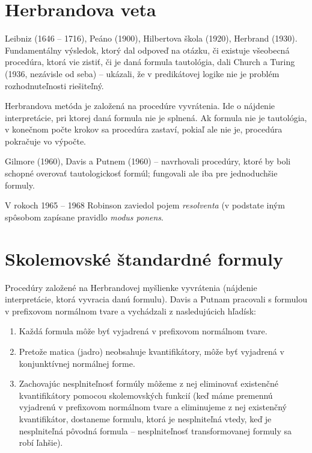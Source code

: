 \section{Herbrandova veta}
\startFIXME
\par Leibniz (1646 -- 1716), Peáno (1900), Hilbertova škola (1920), Herbrand
(1930). Fundamentálny výsledok, ktorý dal odpoveď na otázku, či existuje
všeobecná procedúra, ktorá vie zistiť, či je daná formula tautológia, dali
Church a Turing (1936, nezávisle od seba) -- ukázali, že v predikátovej logike
nie je problém rozhodnuteľnosti riešiteľný.
\par Herbrandova metóda je založená na procedúre vyvrátenia. Ide o nájdenie
interpretácie, pri ktorej daná formula nie je splnená. Ak formula nie je
tautológia, v konečnom počte krokov sa procedúra zastaví, pokiaľ ale nie je,
procedúra pokračuje vo výpočte.

\par Gilmore (1960), Davis a Putnem (1960) -- navrhovali procedúry, ktoré by
boli schopné overovať tautologickosť formúl; fungovali ale iba pre jednoduchšie
formuly.

\par V rokoch 1965 -- 1968 Robinson zaviedol pojem \emph{resolventa} (v podstate
iným spôsobom zapísane pravidlo \emph{modus ponens}.

\section{Skolemovské štandardné formuly}
Procedúry založené na Herbrandovej myšlienke vyvrátenia (nájdenie interpretácie,
ktorá vyvracia danú formulu). Davis a Putnam pracovali s formulou v prefixovom
normálnom tvare a vychádzali z nasledujúcich hľadísk:
\begin{enumerate}
	\item Každá formula môže byť vyjadrená v prefixovom normálnom tvare.
	\item Pretože matica (jadro) neobsahuje kvantifikátory, môže byť
	vyjadrená v konjunktívnej normálnej forme.
	\item Zachovajúc nesplniteľnosť formúly môžeme z nej eliminovať
	existenčné kvantifikátory pomocou skolemovských funkcií (keď máme
	premennú vyjadrenú v prefixovom normálnom tvare a eliminujeme z nej
	existenčný kvantifikátor, dostaneme formulu, ktorá je nesplniteľná
	vtedy, keď je nesplniteľná pôvodná formula -- nesplniteľnosť
	transformovanej formuly sa robí ľahšie).
\end{enumerate}

